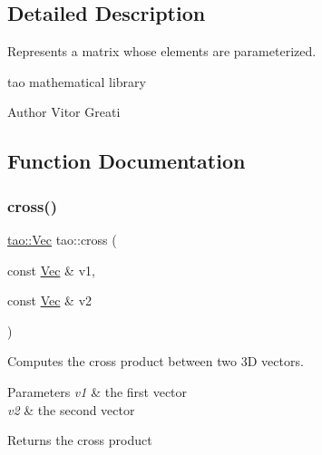 \subsection{Detailed Description}
Represents a matrix whose elements are parameterized. 

tao mathematical library

\begin{DoxyAuthor}{Author}
Vitor Greati 
\end{DoxyAuthor}


\subsection{Function Documentation}
\mbox{\label{namespacetao_aa5a0c330275c16e1b5a6fe994fb0d361}} 
\subsubsection{\texorpdfstring{cross()}{cross()}}
{\footnotesize\ttfamily \mbox{\hyperlink{namespacetao_aef6beca09ab46f269a3189f3027ebc77}{tao\+::\+Vec}} tao\+::cross (\begin{DoxyParamCaption}\item[{const \mbox{\hyperlink{namespacetao_aef6beca09ab46f269a3189f3027ebc77}{Vec}} \&}]{v1,  }\item[{const \mbox{\hyperlink{namespacetao_aef6beca09ab46f269a3189f3027ebc77}{Vec}} \&}]{v2 }\end{DoxyParamCaption})}



Computes the cross product between two 3D vectors. 


\begin{DoxyParams}{Parameters}
{\em v1} & the first vector \\
\hline
{\em v2} & the second vector \\
\hline
\end{DoxyParams}
\begin{DoxyReturn}{Returns}
the cross product 
\end{DoxyReturn}
